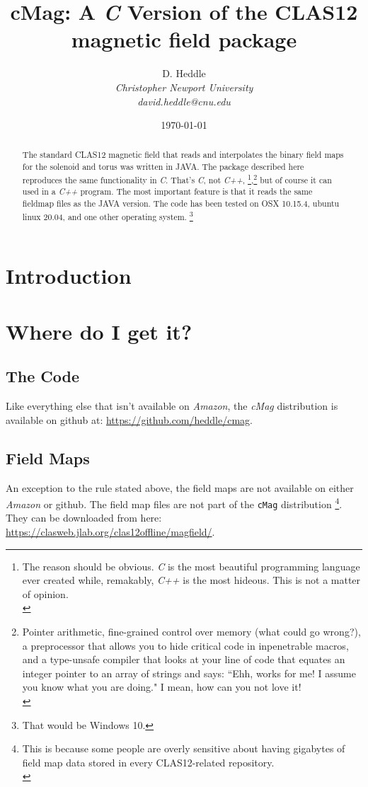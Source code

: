 \documentclass{article}
\title{\textbf{cMag:} A \emph{C} Version of the CLAS12 magnetic field package}
\author{D. Heddle  \\
	\emph{Christopher Newport University}  \\
         \emph{david.heddle@cnu.edu}\\
	}
\date{\today}
\begin{document}
\maketitle
\begin{abstract}
   The standard CLAS12 magnetic field that reads and interpolates the binary field maps for the solenoid and torus was written in JAVA. The package described here reproduces the same functionality in \emph{C}. That's  \emph{C}, not \emph{C++}, 
\footnote{The reason should be obvious. \emph{C} is the most beautiful programming language ever created while, remakably, \emph{C++} is the most hideous. This is not a matter of opinion.\\},\footnote{Pointer arithmetic, fine-grained control over memory (what could go wrong?), a preprocessor that allows you to hide critical code in inpenetrable macros, and a type-unsafe compiler that looks at your line of code that equates an integer pointer to an array of strings and says: ``Ehh, works for me! I assume you know what you are doing." I mean, how can you not love it!\\}
 but of course it can used in a \emph{C++} program. The most important feature is that it reads the same fieldmap files as the JAVA version. The code has been tested on OSX 10.15.4, ubuntu linux 20.04, and one other operating system. \footnote[666]{That would be Windows 10.}


\end{abstract}
\newpage

\section {Introduction}

\section {Where do I get it?}
\subsection {The Code}
Like everything else that isn't available on \textit{Amazon}, the \textit{cMag} distribution is available on github at:
\newline
\newline
\url{https://github.com/heddle/cmag}.
\newline
\newline
\subsection {Field Maps}
An exception to the rule stated above, the field maps are not available on either \textit{Amazon} or github. The field map files are not part of the \texttt{cMag} distribution \footnote{This is because some people are overly sensitive about having gigabytes of field map data stored in every CLAS12-related repository.\\}. They can be downloaded from here:\
\newline
\newline
 \url{https://clasweb.jlab.org/clas12offline/magfield/}.
\newline
\newline
\end{document}
